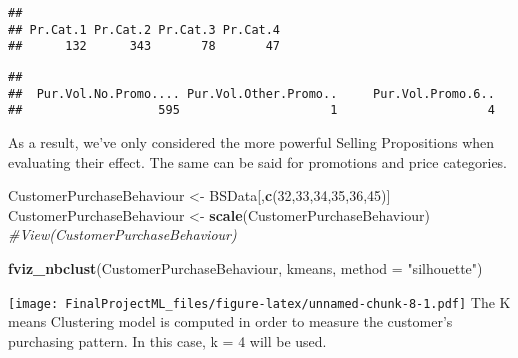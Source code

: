 \documentclass[
]{article}
\newenvironment{Shaded}{\begin{snugshade}}{\end{snugshade}}
\newcommand{\CommentTok}[1]{\textcolor[rgb]{0.56,0.35,0.01}{\textit{#1}}}
\newcommand{\DataTypeTok}[1]{\textcolor[rgb]{0.13,0.29,0.53}{#1}}
\newcommand{\DecValTok}[1]{\textcolor[rgb]{0.00,0.00,0.81}{#1}}
\newcommand{\KeywordTok}[1]{\textcolor[rgb]{0.13,0.29,0.53}{\textbf{#1}}}
\newcommand{\NormalTok}[1]{#1}
\newcommand{\OperatorTok}[1]{\textcolor[rgb]{0.81,0.36,0.00}{\textbf{#1}}}
\newcommand{\StringTok}[1]{\textcolor[rgb]{0.31,0.60,0.02}{#1}}
\begin{document}
\begin{verbatim}
## 
## Pr.Cat.1 Pr.Cat.2 Pr.Cat.3 Pr.Cat.4 
##      132      343       78       47
\end{verbatim}

\begin{Shaded}
\end{Shaded}

\begin{verbatim}
## 
##  Pur.Vol.No.Promo.... Pur.Vol.Other.Promo..     Pur.Vol.Promo.6.. 
##                   595                     1                     4
\end{verbatim}

As a result, we've only considered the more powerful Selling
Propositions when evaluating their effect. The same can be said for
promotions and price categories.

\begin{Shaded}
\begin{Highlighting}[]
\NormalTok{CustomerPurchaseBehaviour <-}\StringTok{ }\NormalTok{BSData[,}\KeywordTok{c}\NormalTok{(}\DecValTok{32}\NormalTok{,}\DecValTok{33}\NormalTok{,}\DecValTok{34}\NormalTok{,}\DecValTok{35}\NormalTok{,}\DecValTok{36}\NormalTok{,}\DecValTok{45}\NormalTok{)]}
\NormalTok{CustomerPurchaseBehaviour <-}\StringTok{ }\KeywordTok{scale}\NormalTok{(CustomerPurchaseBehaviour)}
\CommentTok{#View(CustomerPurchaseBehaviour)}

\KeywordTok{fviz_nbclust}\NormalTok{(CustomerPurchaseBehaviour, kmeans, }\DataTypeTok{method =} \StringTok{"silhouette"}\NormalTok{)}
\end{Highlighting}
\end{Shaded}

\texttt{[image: FinalProjectML\_files/figure-latex/unnamed-chunk-8-1.pdf]}
The K means Clustering model is computed in order to measure the
customer's purchasing pattern. In this case, k = 4 will be used.
\end{document}
